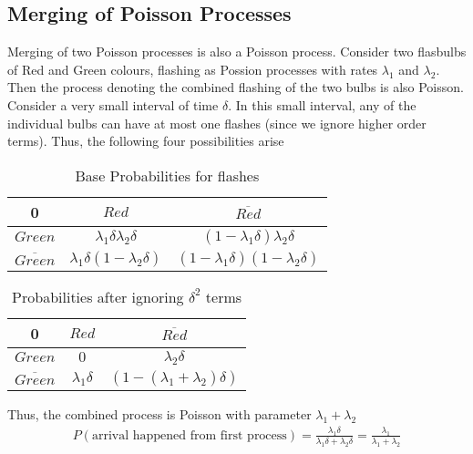 \documentclass[../probability-notes.tex]{subfiles}
\begin{document}
    \subsection{Merging of Poisson Processes}
    Merging of two Poisson processes is also a Poisson process. Consider two flasbulbs of Red and Green colours, flashing as Possion processes with rates $\lambda_{1}$ and $\lambda_{2}$. Then the process denoting the combined flashing of the two bulbs is also Poisson.\newline
    Consider a very small interval of time $\delta$. In this small interval, any of the individual bulbs can have at most one flashes (since we ignore higher order terms). Thus, the following four possibilities arise \newline
    \begin{table}[h]
    \centering
    \begin{tabular}{c|c|c}
        0 & $Red$ & $\overline{Red}$\\ \hline
        $Green$ & $\lambda_{1} \delta \lambda_{2} \delta $ & $(1-\lambda_{1}\delta)  \lambda_{2} \delta$\\ \hline
        $\overline{Green}$ & $\lambda_{1} \delta (1-\lambda_{2}\delta) $ & $(1-\lambda_{1}\delta) (1-\lambda_{2}\delta)$ \\
    \end{tabular}
    \caption{Base Probabilities for flashes}
    \end{table}
    \begin{table}[h]
    \centering
    \begin{tabular}{c|c|c}
        0 & $Red$ & $\overline{Red}$\\ \hline
        $Green$ & $0$ & $ \lambda_{2} \delta$\\ \hline
        $\overline{Green}$ & $\lambda_{1} \delta$ & $(1-(\lambda_{1} + \lambda_{2}) \delta)$ \\
    \end{tabular}
    \caption{Probabilities after ignoring $\delta^{2}$ terms}
    \end{table}

    Thus, the combined process is Poisson with parameter $\lambda_{1} + \lambda_{2}$ \newline
    \begin{align*}
    P(\text{arrival happened from first process}) = \frac{\lambda_{1} \delta}{\lambda_{1} \delta + \lambda_2 \delta} = \frac{\lambda_{1}}{\lambda_{1} + \lambda_{2}}
    \end{align*}
\end{document}
